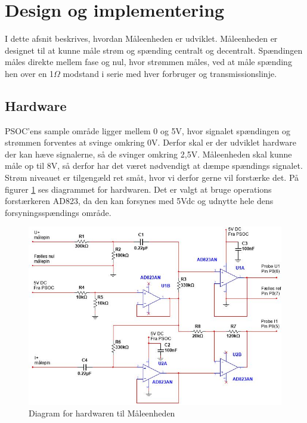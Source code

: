 
\section{Design og implementering}
I dette afsnit beskrives, hvordan Måleenheden er udviklet. Måleenheden er designet til at kunne måle strøm og spænding centralt og decentralt. Spændingen måles direkte mellem fase og nul, hvor strømmen måles, ved at måle spænding hen over en 1$\Omega$ modstand i serie med hver forbruger og transmissionslinje. 

\subsection{Hardware}
PSOC'ens sample område ligger mellem 0 og 5V, hvor signalet spændingen og strømmen forventes at svinge omkring 0V. Derfor skal er der udviklet hardware der kan hæve signalerne, så de svinger omkring 2,5V. Måleenheden skal kunne måle op til 8V, så derfor har det været nødvendigt at dæmpe spændings signalet. Strøm niveauet er tilgengæld ret småt, hvor vi derfor gerne vil forstærke det. På figurer \ref{fig:MaalHardware} ses diagrammet for hardwaren. Det er valgt at bruge operations forstærkeren AD823, da den kan forsynes med 5Vdc og udnytte hele dens forsyningsspændings område.  

\begin{figure}[htbp] %
	\centering
	\includegraphics[width=1\textwidth]{figure/MaalHardware}
	\caption{Diagram for hardwaren til Måleenheden}
	\label{fig:MaalHardware}
\end{figure} 

